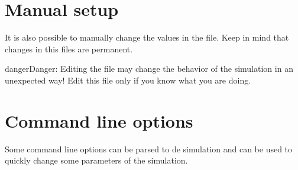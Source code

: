 \documentclass[letterpaper,10pt,english]{sphinxmanual}
\begin{document}
\section{Manual setup}
\label{\detokenize{setup:manual-setup}}
It is also possible to manually change the values in the  file. Keep in mind that changes in this files are permanent.

\begin{sphinxadmonition}{danger}{Danger:}
Editing the  file may change the behavior of the simulation in an unexpected way! Edit this file only if you know what you are doing.
\end{sphinxadmonition}


\section{Command line options}
\label{\detokenize{setup:command-line-options}}\label{\detokenize{setup:clineopts}}
Some command line options can be parsed to de simulation and can be used to quickly change some parameters of the simulation.
\end{document}
